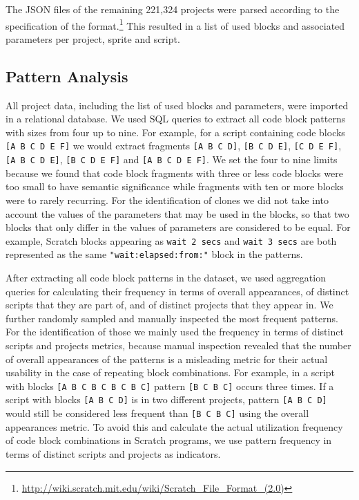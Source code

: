 \documentclass[preprint]{sigplanconf}
\begin{document}
The JSON files of the remaining 221,324 projects were parsed according to the specification of the format.\footnote{\url{http://wiki.scratch.mit.edu/wiki/Scratch_File_Format_(2.0)}} This resulted in a list of used blocks and associated parameters per project, sprite and script.

\subsection{Pattern Analysis}

All project data, including the list of used blocks and parameters, were imported in a relational database. We used SQL queries to extract all code block patterns with sizes from four up to nine. For example, for a script containing code blocks \texttt{[A B C D E F]} we would extract fragments \texttt{[A B C D]}, \texttt{[B C D E]}, \texttt{[C D E F]}, \texttt{[A B C D E]}, \texttt{[B C D E F]} and \texttt{[A B C D E F]}. We set the four to nine limits because we found that code block fragments with three or less code blocks were too small to have semantic significance while fragments with ten or more blocks were to rarely recurring. For the identification of clones we did not take into account the values of the parameters that may be used in the blocks, so that two blocks that only differ in the values of parameters are considered to be equal. For example, Scratch blocks appearing as \texttt{wait 2 secs} and \texttt{wait 3 secs} are both represented as the same \texttt{"wait:elapsed:from:"} block in the patterns.

After extracting all code block patterns in the dataset, we used aggregation queries for calculating their frequency in terms of overall appearances, of distinct scripts that they are part of, and of distinct projects that they appear in. We further randomly sampled and manually inspected the most frequent patterns. For the identification of those we mainly used the frequency in terms of distinct scripts and projects metrics, because manual inspection revealed that the number of overall appearances of the patterns is a misleading metric for their actual usability in the case of repeating block combinations. For example, in a script with blocks 
\texttt{[A B C B C B C B C]} pattern \texttt{[B C B C]} occurs three times. If a script with blocks 
\texttt{[A B C D]} is in two different projects, pattern \texttt{[A B C D]} would still be considered less frequent than \texttt{[B C B C]} using the overall appearances metric. To avoid this and calculate the actual utilization frequency of code block combinations in Scratch programs, we use pattern frequency in terms of distinct scripts and projects as indicators.
\end{document}
